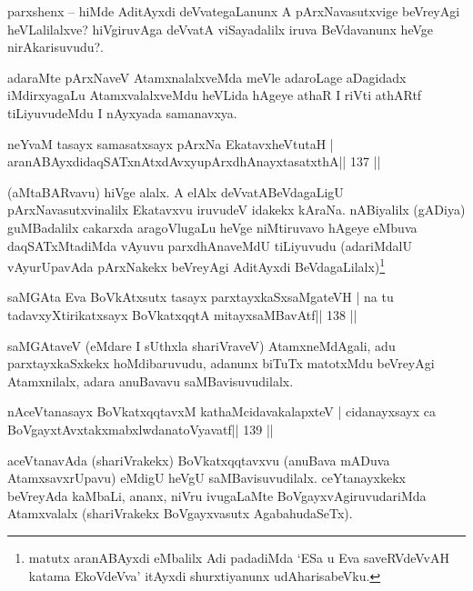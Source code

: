 \begin{artha}
parxshenx -- hiMde AditAyxdi deVvategaLanunx A pArxNavasutxvige beVreyAgi heVLalilalxve? hiVgiruvAga deVvatA viSayadalilx iruva BeVdavanunx heVge nirAkarisuvudu?.

adaraMte pArxNaveV AtamxnalalxveMda meVle adaroLage aDagidadx iMdirxyagaLu AtamxvalalxveMdu heVLida hAgeye athaR I riVti athARtf tiLiyuvudeMdu I nAyxyada samanavxya. 
\end{artha}





\begin{shl}
neYvaM tasayx samasatxsayx pArxNa EkatavxheVtutaH |
aranABAyxdidaqSATxnAtxdAvxyupArxdhAnayxtasatxthA\hfill || 137 ||
\end{shl}

\begin{artha}
(aMtaBARvavu) hiVge alalx. A elAlx deVvatABeVdagaLigU 
pArxNavasutxvinalilx Ekatavxvu iruvudeV idakekx kAraNa. nABiyalilx 
(gADiya) guMBadalilx cakarxda aragoVlugaLu heVge niMtiruvavo hAgeye 
eMbuva daqSATxMtadiMda vAyuvu parxdhAnaveMdU tiLiyuvudu (adariMdalU 
vAyurUpavAda pArxNakekx beVreyAgi AditAyxdi 
BeVdagaLilalx)\footnote{matutx aranABAyxdi eMbalilx Adi padadiMda `ESa 
u Eva saveRVdeVvAH
 katama EkoVdeVva' itAyxdi shurxtiyanunx udAharisabeVku.}
\end{artha}


\begin{shl}
saMGAta Eva BoVkAtx\s sutx tasayx parxtayxkaSxsaMgateVH |
na tu tadavxyXtirikatxsayx BoVkatxqqtA mitayxsaMBavAtf\hfill || 138 ||
\end{shl}

\begin{artha}
saMGAtaveV (eMdare I sUthxla shariVraveV) AtamxneMdAgali, adu  parxtayxkaSxkekx hoMdibaruvudu, adanunx biTuTx matotxMdu beVreyAgi Atamxnilalx, adara anuBavavu saMBavisuvudilalx.
\end{artha}


\begin{shl}
nAceVtanasayx BoVkatxqqtavxM kathaMcidavakalapxteV |
cidanayxsayx ca BoVgayxtAvxtakxmabxlwdanatoVyavatf\hfill || 139 ||
\end{shl}

\begin{artha}
aceVtanavAda (shariVrakekx) BoVkatxqqtavxvu (anuBava mADuva  AtamxsavxrUpavu) eMdigU heVgU saMBavisuvudilalx.  ceYtanayxkekx beVreyAda kaMbaLi, ananx, niVru ivugaLaMte  BoVgayxvAgiruvudariMda Atamxvalalx (shariVrakekx BoVgayxvasutx AgabahudaSeTx).
\end{artha}


